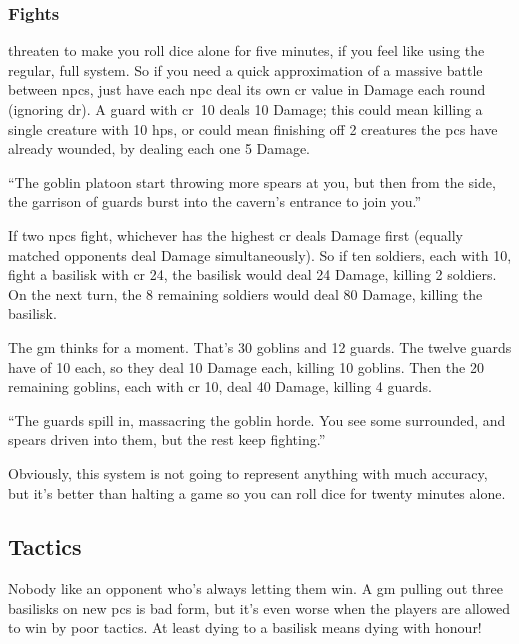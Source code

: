 \begin{multicols}{2}
\subsubsection{ Fights}
\label{npcfights}
threaten to make you roll dice alone for five minutes, if you feel like using the regular, full system.
So if you need a quick approximation of a massive battle between \glspl{npc}, just have each \gls{npc} deal its own \gls{cr} value in Damage each round (ignoring \gls{dr}).
A guard with \gls{cr}~10 deals 10 Damage; this could mean killing a single creature with 10 \glspl{hp}, or could mean finishing off 2 creatures the \glspl{pc} have already wounded, by dealing each one 5 Damage.

\begin{exampletext}
  ``The goblin platoon start throwing more spears at you, but then from the side, the garrison of guards burst into the cavern's entrance to join you.''
\end{exampletext}

If two \glspl{npc} fight, whichever has the highest \gls{cr} deals Damage first (equally matched opponents deal Damage simultaneously).
So if ten soldiers, each with  10, fight a basilisk with \gls{cr} 24, the basilisk would deal 24 Damage, killing 2 soldiers.
On the next turn, the 8 remaining soldiers would deal 80 Damage, killing the basilisk.

\begin{exampletext}

  The \gls{gm} thinks for a moment.
  That's 30 goblins and 12 guards.
  The twelve guards have  of 10 each, so they deal 10 Damage each, killing 10 goblins.
  Then the 20 remaining goblins, each with \gls{cr} 10, deal 40 Damage, killing 4 guards.

  ``The guards spill in, massacring the goblin horde.
  You see some surrounded, and spears driven into them, but the rest keep fighting.''

\end{exampletext}

Obviously, this system is not going to represent anything with much accuracy, but it's better than halting a game so you can roll dice for twenty minutes alone.

\subsection{Tactics}

Nobody like an opponent who's always letting them win.
A \gls{gm} pulling out three \glspl{basilisk} on new \glspl{pc} is bad form, but it's even worse when the players are allowed to win by poor tactics.
At least dying to a basilisk means dying with honour!


\end{multicols}
